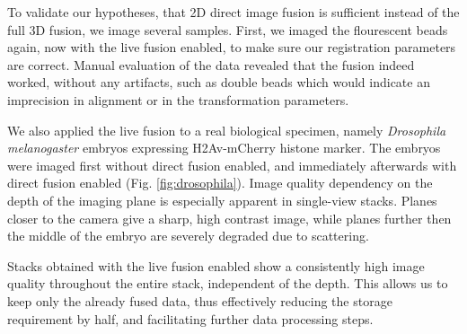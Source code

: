   To validate our hypotheses, that 2D direct image fusion is sufficient instead of the full 3D fusion, we image several samples. First, we imaged the flourescent beads again, now with the live fusion enabled, to make sure our registration parameters are correct. Manual evaluation of the data revealed that the fusion indeed worked, without any artifacts, such as double beads which would indicate an imprecision in alignment or in the transformation parameters.

  We also applied the live fusion to a real biological specimen, namely \textit{Drosophila melanogaster} embryos expressing H2Av-mCherry histone marker. The embryos were imaged first without direct fusion enabled, and immediately afterwards with direct fusion enabled (Fig. \ref{fig:drosophila}). Image quality dependency on the depth of the imaging plane is especially apparent in single-view stacks. Planes closer to the camera give a sharp, high contrast image, while planes further then the middle of the embryo are severely degraded due to scattering.

  Stacks obtained with the live fusion enabled show a consistently high image quality throughout the entire stack, independent of the depth. This allows us to keep only the already fused data, thus effectively reducing the storage requirement by half, and facilitating further data processing steps. 










